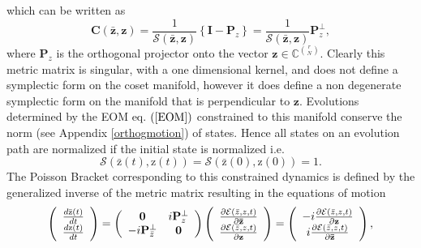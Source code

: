 \documentclass[aps,preprint]{revtex4}%
\begin{document}
which can be written as
\begin{equation}
\mathbf{C}\left(  \mathbf{\mathbf{\bar{z}},\mathbf{z}}\right)  =\frac
{1}{\mathcal{S}\left(  \mathbf{\mathbf{\bar{z}},\mathbf{z}}\right)  }\left\{
\mathbf{I-P}_{z}\right\}  =\frac{1}{\mathcal{S}\left(  \mathbf{\mathbf{\bar
{z}},\mathbf{z}}\right)  }\mathbf{P}_{z}^{\bot},
\end{equation}
where $\mathbf{P}_{z}$ is the orthogonal projector onto the vector
$\mathbf{z}\in\mathbb{C}^{\binom{r}{N}}$. Clearly this metric matrix is
singular, with a one dimensional kernel, and does not define a symplectic form
on the coset manifold, however it does define a non degenerate symplectic form
on the manifold that is perpendicular to $\mathbf{z}$. Evolutions determined
by the EOM eq. $\left(  \ref{EOM}\right)  $ constrained to this manifold
conserve the norm (see Appendix \ref{orthogmotion}) of states. Hence all
states on an evolution path are normalized if the initial state is normalized
i.e.
\begin{equation}
\mathcal{S}\left(  \mathrm{\bar{z}}\left(  t\right)  \mathbf{,}\mathrm{z}%
\left(  t\right)  \right)  =\mathcal{S}\left(  \mathrm{\bar{z}}\left(
0\right)  \mathbf{,}\mathrm{z}\left(  0\right)  \right)  =1.
\end{equation}
The Poisson Bracket corresponding to this constrained dynamics is defined by
the generalized inverse of the metric matrix resulting in the equations of
motion
\begin{equation}
\left(
\begin{array}
[c]{c}%
\frac{d\mathrm{\bar{z}}\left(  t\right)  }{dt}\\
\frac{d\mathrm{z}\left(  t\right)  }{dt}%
\end{array}
\right)  =\left(
\begin{array}
[c]{cc}%
\mathbf{0} & i\mathbf{P}_{z}^{\bot}\\
-i\mathbf{P}_{\bar{z}}^{\bot} & \mathbf{0}%
\end{array}
\right)  \left(
\begin{array}
[c]{c}%
\frac{\partial\mathcal{E}\left(  \bar{z},z\mathbf{,}t\right)  }{\partial
\mathbf{\bar{z}}}\\
\frac{\partial\mathcal{E}\left(  \bar{z},z\mathbf{,}t\right)  }{\partial
\mathbf{z}}%
\end{array}
\right)  =\left(
\begin{array}
[c]{c}%
-i\frac{\partial\mathcal{E}\left(  \bar{z},z\mathbf{,}t\right)  }%
{\partial\mathbf{z}}\\
i\frac{\partial\mathcal{E}\left(  \bar{z},z\mathbf{,}t\right)  }%
{\partial\mathbf{\bar{z}}}%
\end{array}
\right)  ,
\end{equation}
\end{document}
